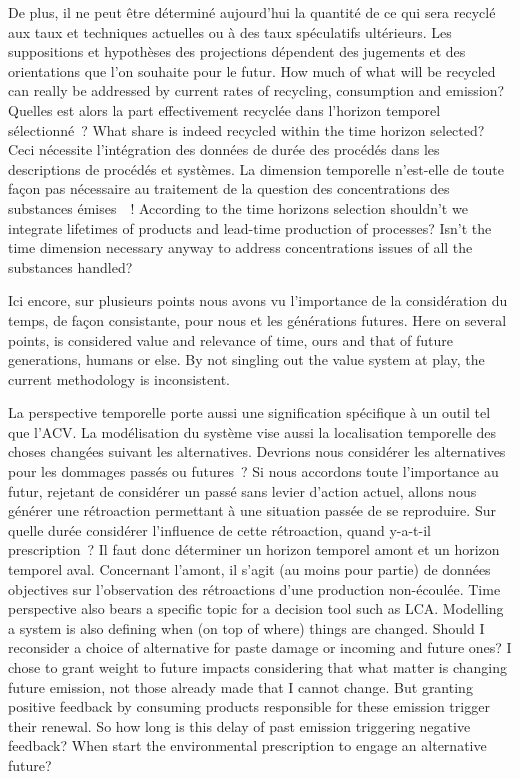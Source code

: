 De plus, il ne peut être déterminé aujourd'hui la quantité de ce qui sera recyclé aux taux et techniques actuelles ou à des taux spéculatifs ultérieurs.
Les suppositions et hypothèses des projections dépendent des jugements et des orientations que l'on souhaite pour le futur.
How much of what will be recycled can really be addressed by current rates of recycling, consumption and emission?
Quelles est alors la part effectivement recyclée dans l'horizon temporel sélectionné~?
What share is indeed recycled within the time horizon selected?
Ceci nécessite l'intégration des données de durée des procédés dans les descriptions de procédés et systèmes.
La dimension temporelle n'est-elle de toute façon pas nécessaire au traitement de la question des concentrations des substances émises~~!
According to the time horizons selection shouldn't we integrate lifetimes of products and lead-time production of processes?
Isn't the time dimension necessary anyway to address concentrations issues of all the substances handled?

Ici encore, sur plusieurs points nous avons vu l'importance de la considération du temps, de façon consistante, pour nous et les générations futures.
Here on several points, is considered value and relevance of time, ours and that of future generations, humans or else.
By not singling out the value system at play, the current methodology is inconsistent.

La perspective temporelle porte aussi une signification spécifique à un outil tel que l'ACV.
La modélisation du système vise aussi la localisation temporelle des choses changées suivant les alternatives.
Devrions nous considérer les alternatives pour les dommages passés ou futures~?
Si nous accordons toute l'importance au futur, rejetant de considérer un passé sans levier d'action actuel, allons nous générer une rétroaction permettant à une situation passée de se reproduire.
Sur quelle durée considérer l'influence de cette rétroaction, quand y-a-t-il prescription~?
Il faut donc déterminer un horizon temporel amont et un horizon temporel aval.
Concernant l'amont, il s'agit (au moins pour partie) de données objectives sur l’observation des rétroactions d'une production non-écoulée.
Time perspective also bears a specific topic for a decision tool such as LCA.
Modelling a system is also defining when (on top of where) things are changed.
Should I reconsider a choice of alternative for paste damage or incoming and future ones?
I chose to grant weight to future impacts considering that what matter is changing future emission, not those already made that I cannot change.
But granting positive feedback by consuming products responsible for these emission trigger their renewal.
So how long is this delay of past emission triggering negative feedback?
When start the environmental prescription to engage an alternative future?

